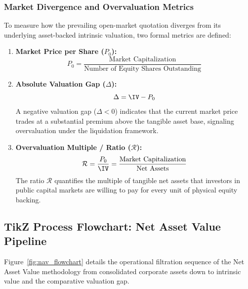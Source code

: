 \subsubsection{Market Divergence and Overvaluation Metrics}
To measure how the prevailing open-market quotation diverges from its underlying asset-backed intrinsic valuation, two formal metrics are defined:
\begin{enumerate}[label=\textbf{(\alph*)}]
    \item \textbf{Market Price per Share ($P_0$):}
    \begin{equation}
        P_0 = \frac{\text{Market Capitalization}}{\text{Number of Equity Shares Outstanding}}
    \end{equation}
    \item \textbf{Absolute Valuation Gap ($\Delta$):}
    \begin{equation}
        \Delta = \IV - P_0
    \end{equation}
    A negative valuation gap ($\Delta < 0$) indicates that the current market price trades at a substantial premium above the tangible asset base, signaling overvaluation under the liquidation framework.
    \item \textbf{Overvaluation Multiple / Ratio ($\mathcal{R}$):}
    \begin{equation}
        \mathcal{R} = \frac{P_0}{\IV} = \frac{\text{Market Capitalization}}{\text{Net Assets}}
    \end{equation}
    The ratio $\mathcal{R}$ quantifies the multiple of tangible net assets that investors in public capital markets are willing to pay for every unit of physical equity backing.
\end{enumerate}

\subsection{TikZ Process Flowchart: Net Asset Value Pipeline}
Figure~\ref{fig:nav_flowchart} details the operational filtration sequence of the Net Asset Value methodology from consolidated corporate assets down to intrinsic value and the comparative valuation gap.

